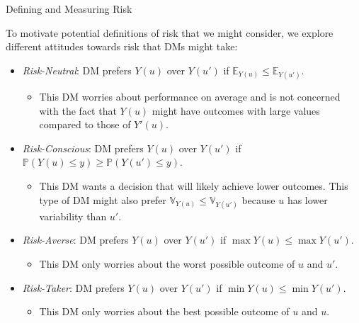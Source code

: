 \documentclass[9pt]{beamer}
\begin{document}
%
\begin{frame}{Defining and Measuring Risk}

To motivate potential definitions of risk that we might consider, we explore different attitudes towards risk that DMs might take: 

\begin{block}{}
\begin{itemize}
   \setlength{\itemsep}{10pt}
\item {\em Risk-Neutral}: DM prefers $Y(u)$ over $Y(u')$ if $\mathbb{E}_{Y(u)}\leq \mathbb{E}_{Y(u')}$.  

\begin{itemize}
\item This DM worries about performance on average and is not concerned with the fact that $Y(u)$ might have outcomes with large values compared to those of $Y'(u)$. 
\end{itemize}
\item {\em Risk-Conscious}: DM prefers $Y(u)$ over $Y(u')$ if $\mathbb{P}(Y(u)\leq y)\geq \mathbb{P}(Y(u')\leq y)$.  

\begin{itemize}
\item This DM wants a decision that will likely achieve lower outcomes. This type of DM might also prefer $\mathbb{V}_{Y(u)}\leq \mathbb{V}_{Y(u')}$ because $u$ has lower variability than $u'$.
\end{itemize}
\item {\em Risk-Averse}: DM prefers $Y(u)$ over $Y(u')$ if $\max  Y(u)\leq \max Y(u')$.  

\begin{itemize}
\item This DM only worries about the worst possible outcome of $u$ and $u'$.
\end{itemize}
\item {\em Risk-Taker}: DM prefers $Y(u)$ over $Y(u')$ if $\min Y(u)\leq \min Y(u')$.  

\begin{itemize}
\item This DM only worries about the best possible outcome of $u$ and $u$.
\end{itemize}

\end{itemize}
\end{block}


\end{frame}
\end{document}
